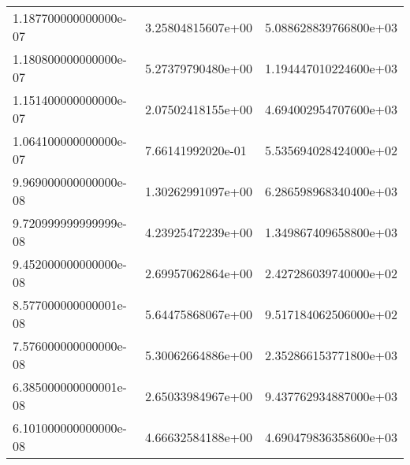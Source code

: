 \begin{center}
{\begin{xtabular}{|l|l|l|}
1.187700000000000e-07 & 3.25804815607e+00 & 5.088628839766800e+03 \\ 
1.180800000000000e-07 & 5.27379790480e+00 & 1.194447010224600e+03 \\ 
1.151400000000000e-07 & 2.07502418155e+00 & 4.694002954707600e+03 \\ 
1.064100000000000e-07 & 7.66141992020e-01 & 5.535694028424000e+02 \\ 
9.969000000000000e-08 & 1.30262991097e+00 & 6.286598968340400e+03 \\ 
9.720999999999999e-08 & 4.23925472239e+00 & 1.349867409658800e+03 \\ 
9.452000000000000e-08 & 2.69957062864e+00 & 2.427286039740000e+02 \\ 
8.577000000000001e-08 & 5.64475868067e+00 & 9.517184062506000e+02 \\ 
7.576000000000000e-08 & 5.30062664886e+00 & 2.352866153771800e+03 \\ 
6.385000000000001e-08 & 2.65033984967e+00 & 9.437762934887000e+03 \\ 
6.101000000000000e-08 & 4.66632584188e+00 & 4.690479836358600e+03 \\
\end{xtabular}}
\end{center}
 \label{tab:L3}
%
%
\tablelasttail{\hline \hline}
